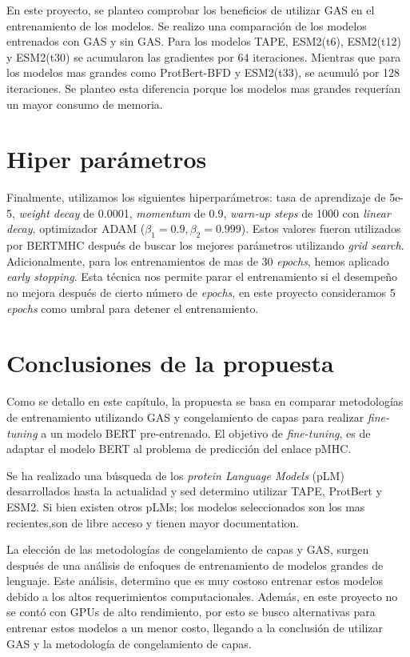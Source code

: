 En este proyecto, se planteo  comprobar los beneficios de utilizar GAS en el entrenamiento de los modelos. Se realizo una comparación de los modelos entrenados con GAS y sin GAS. Para los modelos TAPE, ESM2(t6), ESM2(t12) y ESM2(t30) se acumularon las gradientes por 64 iteraciones. Mientras que para los modelos mas grandes como ProtBert-BFD y ESM2(t33), se acumuló por 128 iteraciones. Se planteo esta diferencia porque los modelos mas grandes requerían un mayor consumo de memoria.


\section{Hiper parámetros}\label{sec:hyperparam}
Finalmente, utilizamos los siguientes hiperparámetros: tasa de aprendizaje de 5e-5, \textit{weight decay} de 0.0001, \textit{momentum} de 0.9, \textit{warn-up steps} de 1000 con \textit{linear decay}, optimizador ADAM ($\beta_1 = 0.9, \beta_2=0.999$). Estos valores fueron utilizados por BERTMHC \citep{cheng2021bertmhc} después de buscar los mejores parámetros utilizando \textit{grid search}. Adicionalmente, para los entrenamientos de mas de 30 \textit{epochs}, hemos aplicado  \textit{early stopping}. Esta técnica nos permite parar el entrenamiento si el desempeño no mejora después de cierto número de \textit{epochs}, en este proyecto consideramos 5 \textit{epochs} como umbral para detener el entrenamiento.


\section{Conclusiones de la propuesta}

Como se detallo en este capítulo, la propuesta se basa en comparar metodologías de entrenamiento utilizando GAS y congelamiento de capas para realizar \textit{fine-tuning} a un modelo BERT pre-entrenado. El objetivo de \textit{fine-tuning}, es de adaptar el modelo BERT al problema de predicción del enlace pMHC.

Se ha realizado una búsqueda de los \textit{protein Language Models} (pLM) desarrollados hasta la actualidad y sed determino utilizar TAPE, ProtBert y ESM2.  Si bien existen otros pLMs; los modelos seleccionados son los mas recientes,son de libre acceso y tienen mayor documentation. 

La elección de las metodologías de congelamiento de capas y GAS, surgen después de una análisis de enfoques de entrenamiento de modelos grandes de lenguaje. Este análisis, determino que es muy costoso entrenar estos modelos debido a los altos requerimientos computacionales. Además, en este proyecto no se contó con GPUs de alto rendimiento, por esto se busco alternativas para entrenar estos modelos a un menor costo, llegando a la conclusión de utilizar GAS y la metodología de congelamiento de capas.


